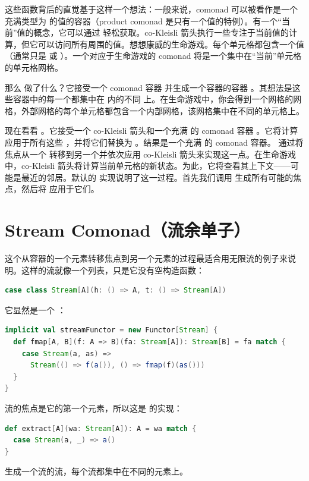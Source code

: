这些函数背后的直觉基于这样一个想法：一般来说，comonad 可以被看作是一个充满类型为  的值的容器（product comonad 是只有一个值的特例）。有一个“当前”值的概念，它可以通过  轻松获取。co-Kleisli 箭头执行一些专注于当前值的计算，但它可以访问所有周围的值。想想康威的生命游戏。每个单元格都包含一个值（通常只是  或 ）。一个对应于生命游戏的 comonad 将是一个集中在“当前”单元格的单元格网格。

那么  做了什么？它接受一个 comonad 容器  并生成一个容器的容器 。其想法是这些容器中的每一个都集中在  内的不同  上。在生命游戏中，你会得到一个网格的网格，外部网格的每个单元格都包含一个内部网格，该网格集中在不同的单元格上。

现在看看 。它接受一个 co-Kleisli 箭头和一个充满  的 comonad 容器 。它将计算应用于所有这些 ，并将它们替换为 。结果是一个充满  的 comonad 容器。 通过将焦点从一个  转移到另一个并依次应用 co-Kleisli 箭头来实现这一点。在生命游戏中，co-Kleisli 箭头将计算当前单元格的新状态。为此，它将查看其上下文——可能是最近的邻居。默认的  实现说明了这一过程。首先我们调用  生成所有可能的焦点，然后将  应用于它们。

\section{Stream Comonad（流余单子）}

这个从容器的一个元素转移焦点到另一个元素的过程最适合用无限流的例子来说明。这样的流就像一个列表，只是它没有空构造函数：

\begin{lstlisting}[language=Scala]
case class Stream[A](h: () => A, t: () => Stream[A])
\end{lstlisting}
它显然是一个 ：

\begin{lstlisting}[language=Scala]
implicit val streamFunctor = new Functor[Stream] {
  def fmap[A, B](f: A => B)(fa: Stream[A]): Stream[B] = fa match {
    case Stream(a, as) =>
      Stream(() => f(a()), () => fmap(f)(as()))
  }
}
\end{lstlisting}
流的焦点是它的第一个元素，所以这是  的实现：

\begin{lstlisting}[language=Scala]
def extract[A](wa: Stream[A]): A = wa match {
  case Stream(a, _) => a()
}
\end{lstlisting}
 生成一个流的流，每个流都集中在不同的元素上。

